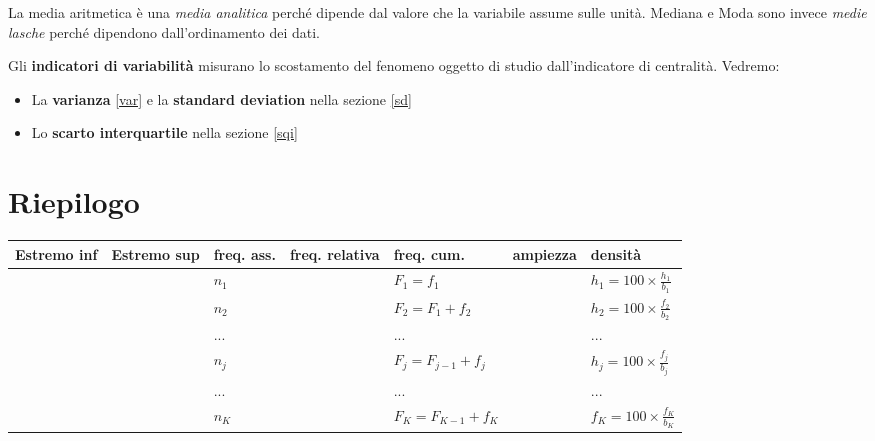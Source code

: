 \documentclass[
  11pt,
]{book}
\providecommand{\tightlist}{%
  \setlength{\itemsep}{0pt}\setlength{\parskip}{0pt}}
\theoremstyle{mytheoremstyle}
\theoremstyle{mydefstyle}
\begin{document}
La media aritmetica è una \emph{media analitica} perché dipende dal valore che la variabile assume sulle unità.
Mediana e Moda sono invece \emph{medie lasche} perché dipendono dall'ordinamento dei dati.

Gli \textbf{indicatori di variabilità} misurano lo scostamento del fenomeno oggetto di studio dall'indicatore di centralità. Vedremo:

\begin{itemize}
\tightlist
\item
  La \textbf{varianza} \ref{var} e la \textbf{standard deviation} nella sezione \ref{sd}
\item
  Lo \textbf{scarto interquartile} nella sezione \ref{sqi}
\end{itemize}

\section{Riepilogo}\label{riepilogo}

\begin{info2}

\vspace{10pt}\scriptsize

\begin{center}

\begin{tabular}{>{}l>{}ll>{}ll>{}ll}
\toprule
Estremo inf & Estremo sup & freq. ass. & freq. relativa & freq. cum. & ampiezza & densità\\
\midrule
\cellcolor{white}{$[\text{x}_1,$} & \cellcolor{white}{$\text{x}_2)$} & $n_1$ & \cellcolor{white}{$f_1=\frac{n_1}{n}$} & $F_1=f_1$ & \cellcolor{white}{$b_1=\text{x}_2-\text{x}_1$} & $h_1=100\times \frac{ h_1}{b_1}$\\
\cellcolor{white}{$[\text{x}_2,$} & \cellcolor{white}{$\text{x}_3)$} & $n_2$ & \cellcolor{white}{$f_2=\frac{n_2}n$} & $F_2=F_1+f_2$ & \cellcolor{white}{$b_2=\text{x}_3-\text{x}_2$} & $h_2=100\times \frac{ f_2}{b_2}$\\
\cellcolor{white}{$...$} & \cellcolor{white}{$...$} & $...$ & \cellcolor{white}{$...$} & $...$ & \cellcolor{white}{$...$} & \vphantom{1} $...$\\
\cellcolor{white}{$[\text{x}_j,$} & \cellcolor{white}{$\text{x}_{j+1})$} & $n_j$ & \cellcolor{white}{$f_j=\frac{n_j}n$} & $F_j=F_{j-1}+f_j$ & \cellcolor{white}{$b_j=\text{x}_{j+1}-\text{x}_j$} & $h_j=100\times \frac{ f_j}{b_j}$\\
\cellcolor{white}{$...$} & \cellcolor{white}{$...$} & $...$ & \cellcolor{white}{$...$} & $...$ & \cellcolor{white}{$...$} & $...$\\
\cellcolor{white}{$[\text{x}_K,$} & \cellcolor{white}{$\text{x}_{K+1})$} & $n_K$ & \cellcolor{white}{$f_K=\frac{n_K}n$} & $F_K=F_{K-1}+f_K$ & \cellcolor{white}{$b_K=\text{x}_{K+1}-\text{x}_K$} & $f_K=100\times \frac{ f_K}{b_K}$\\
\bottomrule
\end{tabular}

\end{center}

\end{info2}
\end{document}
